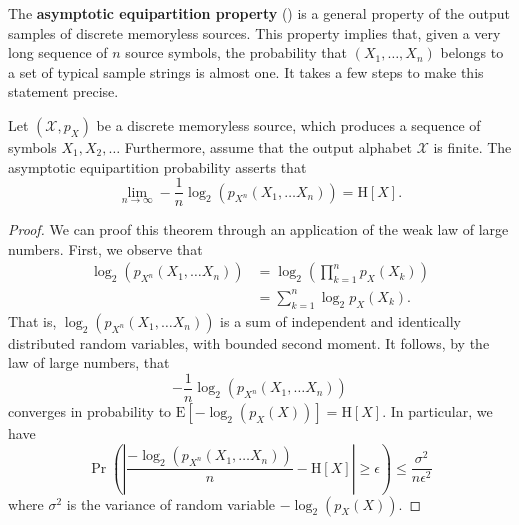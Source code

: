 The \textbf{asymptotic equipartition property} () is a general property of the output samples of discrete memoryless sources.
This property implies that, given a very long sequence of $n$ source symbols, the probability that $(X_1, \ldots, X_n)$ belongs to a set of typical sample strings is almost one.
It takes a few steps to make this statement precise.

\begin{theorem} \label{theorem:WeakLawEntropy}
Let $(\mathcal{X}, p_X)$ be a discrete memoryless source, which produces a sequence of symbols $X_1, X_2, \ldots $
Furthermore, assume that the output alphabet $\mathcal{X}$ is finite.
The asymptotic equipartition probability asserts that
\begin{equation*}
\lim_{n \rightarrow \infty} - \frac{1}{n} \log_2 \left( p_{X^n} (X_1, \ldots X_n) \right)
= \mathrm{H} [X] .
\end{equation*}
\end{theorem}
\begin{proof}
We can proof this theorem through an application of the weak law of large numbers.
First, we observe that
\begin{equation*}
\begin{split}
\log_2 \left( p_{X^n} (X_1, \ldots X_n) \right)
&= \log_2 \left( \prod_{k=1}^n p_{X} (X_k) \right) \\
&= \sum_{k=1}^n \log_2 p_{X} (X_k) .
\end{split}
\end{equation*}
That is, $\log_2 \left( p_{X^n} (X_1, \ldots X_n) \right)$ is a sum of independent and identically distributed random variables, with bounded second moment.
It follows, by the law of large numbers, that
\begin{equation*}
- \frac{1}{n} \log_2 \left( p_{X^n} (X_1, \ldots X_n) \right)
\end{equation*}
converges in probability to $\mathrm{E} \left[ - \log_2 (p_X(X)) \right] = \mathrm{H}[X]$.
In particular, we have
\begin{equation*}
\Pr \left(
\left| \frac{- \log_2 \left( p_{X^n} (X_1, \ldots X_n) \right)}{n} - \mathrm{H}[X] \right|
\geq \epsilon \right)
\leq \frac{ \sigma^2}{n \epsilon^2}
\end{equation*}
where $\sigma^2$ is the variance of random variable $- \log_2 (p_X(X))$.
\end{proof}

